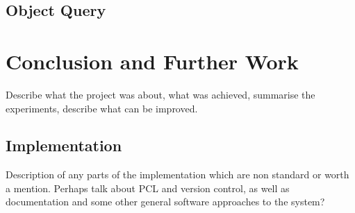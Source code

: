\documentclass[11pt,a4paper]{kth-mag}
\begin{document}
\section{Object Query}
\chapter{Conclusion and Further Work}
\label{chap:conc}
Describe what the project was about, what was achieved, summarise the
experiments, describe what can be improved.

\begin{appendices}
  \chapter{Implementation}
  \label{chap:impl}
  Description of any parts of the implementation which are non standard or worth a
  mention. Perhaps talk about PCL and version control, as well as documentation
  and some other general software approaches to the system?
\end{appendices}
\printbibliography
\end{document}
